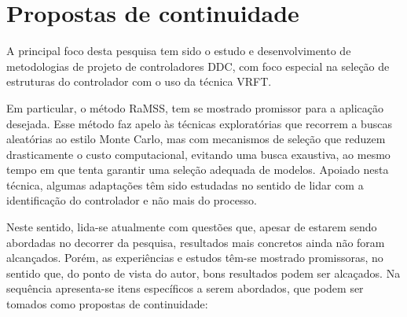 \section{Propostas de continuidade}\label{sec:Prop_cont}

A principal foco desta pesquisa tem sido o estudo e desenvolvimento de metodologias de projeto de controladores DDC, com foco especial na seleção de estruturas do controlador com o uso da técnica VRFT.

Em particular, o método RaMSS, tem se mostrado promissor para a aplicação desejada. Esse método faz apelo às técnicas exploratórias que recorrem a buscas aleatórias ao estilo Monte Carlo, mas com mecanismos de seleção que reduzem drasticamente o custo computacional, evitando uma busca exaustiva, ao mesmo tempo em que tenta garantir uma seleção adequada de modelos.
%
Apoiado nesta técnica, algumas adaptações têm sido estudadas no sentido de lidar com a identificação do controlador e não mais do processo.

Neste sentido, lida-se atualmente com questões que, apesar de estarem sendo abordadas no decorrer da pesquisa, resultados mais concretos ainda não foram alcançados.
Porém, as experiências e estudos têm-se mostrado promissoras, no sentido que, do ponto de vista do autor, bons resultados podem ser alcaçados.
Na sequência apresenta-se itens específicos a serem abordados, que podem ser tomados como propostas de continuidade:


